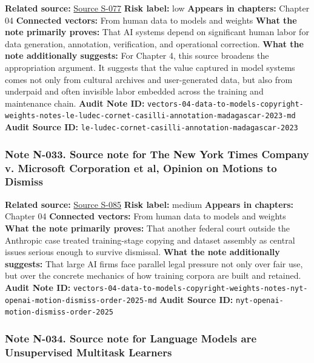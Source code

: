 \documentclass[
  american,
  11pt,
  letterpaper,
]{article}
\begin{document}
\textbf{Related source:}
\hyperref[source-s-077-the-problem-with-annotation-human-labour-and-outsourcing-between-france-and-madagascar]{Source
S-077} \textbf{Risk label:} low \textbf{Appears in chapters:} Chapter 04
\textbf{Connected vectors:} From human data to models and weights
\textbf{What the note primarily proves:} That AI systems depend on
significant human labor for data generation, annotation, verification,
and operational correction. \textbf{What the note additionally
suggests:} For Chapter 4, this source broadens the appropriation
argument. It suggests that the value captured in model systems comes not
only from cultural archives and user-generated data, but also from
underpaid and often invisible labor embedded across the training and
maintenance chain. \textbf{Audit Note ID:}
\texttt{vectors-04-data-to-models-copyright-weights-notes-le-ludec-cornet-casilli-annotation-madagascar-2023-md}
\textbf{Audit Source ID:}
\texttt{le-ludec-cornet-casilli-annotation-madagascar-2023}

\subsubsection{Note N-033. Source note for The New York Times Company v.
Microsoft Corporation et al, Opinion on Motions to
Dismiss}\label{note-n-033-vectors-04-data-to-models-copyright-weights-notes-nyt-openai-motion-dismiss-order-2025-md}

\textbf{Related source:}
\hyperref[source-s-085-the-new-york-times-company-v-microsoft-corporation-et-al-opinion-on-motions-to-dismiss]{Source
S-085} \textbf{Risk label:} medium \textbf{Appears in chapters:} Chapter
04 \textbf{Connected vectors:} From human data to models and weights
\textbf{What the note primarily proves:} That another federal court
outside the Anthropic case treated training-stage copying and dataset
assembly as central issues serious enough to survive dismissal.
\textbf{What the note additionally suggests:} That large AI firms face
parallel legal pressure not only over fair use, but over the concrete
mechanics of how training corpora are built and retained. \textbf{Audit
Note ID:}
\texttt{vectors-04-data-to-models-copyright-weights-notes-nyt-openai-motion-dismiss-order-2025-md}
\textbf{Audit Source ID:} \texttt{nyt-openai-motion-dismiss-order-2025}

\subsubsection{Note N-034. Source note for Language Models are
Unsupervised Multitask
Learners}\label{note-n-034-vectors-04-data-to-models-copyright-weights-notes-radford-gpt2-webtext-2019-md}
\end{document}
